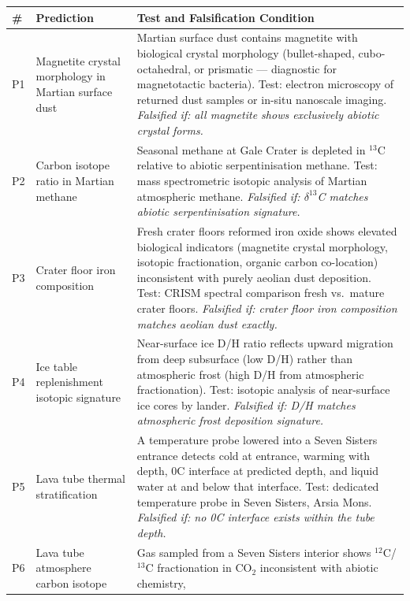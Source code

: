 \documentclass[11pt, a4paper]{article}
\begin{document}
\begin{table}[h]
\centering
\small
\begin{tabularx}{\linewidth}{p{0.4cm}p{2.6cm}X}
\toprule
\textbf{\#} & \textbf{Prediction} &
\textbf{Test and Falsification Condition} \\
\midrule
P1 & Magnetite crystal morphology in
  Martian surface dust &
  Martian surface dust contains magnetite
  with biological crystal morphology
  (bullet-shaped, cubo-octahedral, or
  prismatic — diagnostic for magnetotactic
  bacteria). Test: electron microscopy of
  returned dust samples or in-situ nanoscale
  imaging. \textit{Falsified if: all magnetite
  shows exclusively abiotic crystal forms.} \\[0.3em]
P2 & Carbon isotope ratio in Martian methane &
  Seasonal methane at Gale Crater is
  depleted in $^{13}$C relative to abiotic
  serpentinisation methane.
  Test: mass spectrometric isotopic analysis
  of Martian atmospheric methane.
  \textit{Falsified if: $\delta^{13}$C
  matches abiotic serpentinisation signature.} \\[0.3em]
P3 & Crater floor iron composition &
  Fresh crater floors reformed iron oxide
  shows elevated biological indicators
  (magnetite crystal morphology, isotopic
  fractionation, organic carbon co-location)
  inconsistent with purely aeolian dust
  deposition. Test: CRISM spectral comparison
  fresh vs.\ mature crater floors.
  \textit{Falsified if: crater floor iron
  composition matches aeolian dust exactly.} \\[0.3em]
P4 & Ice table replenishment isotopic signature &
  Near-surface ice D/H ratio reflects
  upward migration from deep subsurface
  (low D/H) rather than atmospheric frost
  (high D/H from atmospheric fractionation).
  Test: isotopic analysis of near-surface
  ice cores by lander.
  \textit{Falsified if: D/H matches
  atmospheric frost deposition signature.} \\[0.3em]
P5 & Lava tube thermal stratification &
  A temperature probe lowered into a Seven
  Sisters entrance detects cold at entrance,
  warming with depth, 0\textdegree{}C
  interface at predicted depth, and liquid
  water at and below that interface.
  Test: dedicated temperature probe in
  Seven Sisters, Arsia Mons.
  \textit{Falsified if: no 0\textdegree{}C
  interface exists within the tube depth.} \\[0.3em]
P6 & Lava tube atmosphere carbon isotope &
  Gas sampled from a Seven Sisters interior
  shows $^{12}$C/$^{13}$C fractionation in
  CO$_2$ inconsistent with abiotic chemistry,

\end{tabularx}
\end{table}
\end{document}
